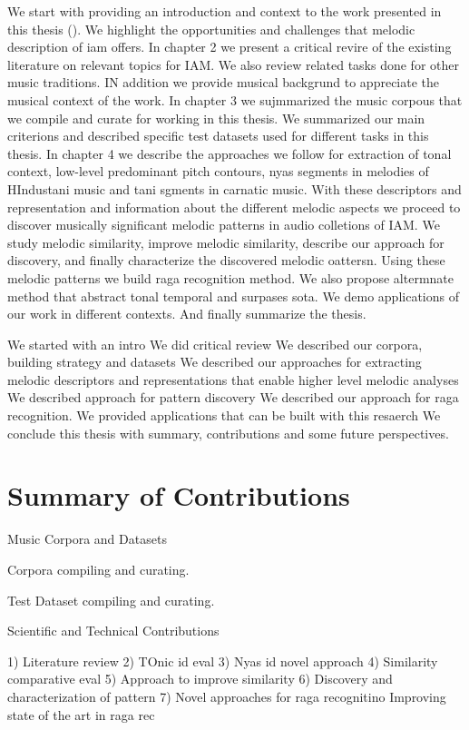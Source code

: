 We start with providing an introduction and context to the work presented in this thesis (). We highlight the opportunities and challenges that melodic description of \gls{iam} offers. In chapter 2 we present a critical revire of the existing literature on relevant topics for IAM. We also review related tasks done for other music traditions. IN addition we provide musical backgrund to appreciate the musical context of the work. In chapter 3 we sujmmarized the music corpous that we compile and curate for working in this thesis. We summarized our main criterions and described specific test datasets used for different tasks in this thesis. In chapter 4 we describe the approaches we follow for extraction of tonal context, low-level predominant pitch contours, nyas segments in melodies of HIndustani music and tani sgments in carnatic music. With these descriptors and representation and  information about the different melodic aspects we proceed to discover musically significant melodic patterns in audio colletions of IAM. We study melodic similarity, improve melodic similarity, describe our approach for discovery, and finally characterize the discovered melodic oattersn. Using these melodic patterns we build raga recognition method. We also propose altermnate method that abstract tonal temporal and surpases sota. We demo applications of our work in different contexts. And finally summarize the thesis. 


We started with an intro 
We did critical review 
We described our corpora, building strategy and datasets
We described our approaches for extracting melodic descriptors and representations that enable higher level melodic analyses
We described approach for pattern discovery
We described our approach for raga recognition.
We provided applications that can be built with this resaerch
We conclude this thesis with summary, contributions and some future perspectives.




\section{Summary of Contributions}
\label{sec:summary_contributions}

Music Corpora and Datasets

Corpora compiling and curating.

Test Dataset compiling and curating.

Scientific and Technical Contributions

1) Literature review
2) TOnic id eval
3) Nyas id novel approach
4) Similarity comparative eval
5) Approach to improve similarity
6) Discovery and characterization of pattern
7) Novel approaches for raga recognitino Improving state of the art in raga rec





